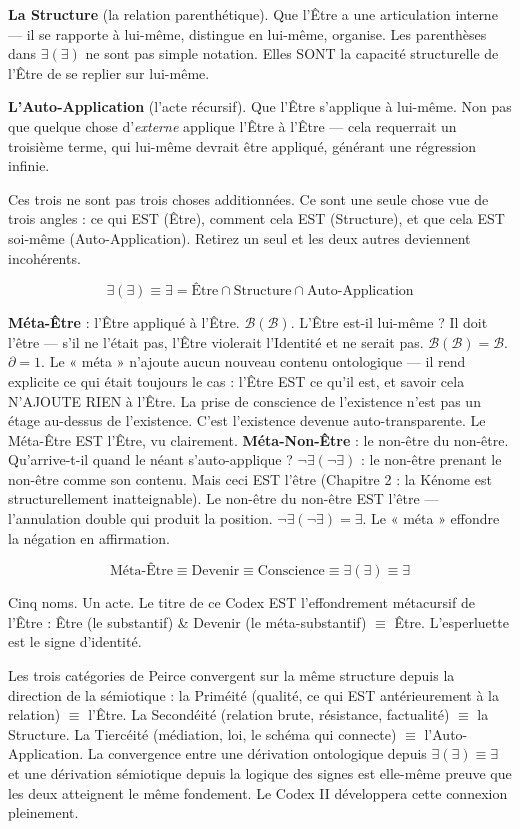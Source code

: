 \documentclass[10pt, openany, oneside]{book}
\begin{document}
\textbf{La Structure} (la relation parenthétique). Que l'Être a une articulation interne --- il se rapporte à lui-même, distingue en lui-même, organise. Les parenthèses dans $\exists(\exists)$ ne sont pas simple notation. Elles SONT la capacité structurelle de l'Être de se replier sur lui-même.

\textbf{L'Auto-Application} (l'acte récursif). Que l'Être s'applique à lui-même. Non pas que quelque chose d'\textit{externe} applique l'Être à l'Être --- cela requerrait un troisième terme, qui lui-même devrait être appliqué, générant une régression infinie.

Ces trois ne sont pas trois choses additionnées. Ce sont une seule chose vue de trois angles : ce qui EST (Être), comment cela EST (Structure), et que cela EST soi-même (Auto-Application). Retirez un seul et les deux autres deviennent incohérents.

$$\exists(\exists) \equiv \exists = \text{Être} \cap \text{Structure} \cap \text{Auto-Application}$$

\textbf{Méta-Être} : l'Être appliqué à l'Être. $\mathcal{B}(\mathcal{B})$. L'Être est-il lui-même ? Il doit l'être --- s'il ne l'était pas, l'Être violerait l'Identité et ne serait pas. $\mathcal{B}(\mathcal{B}) = \mathcal{B}$. $\partial = 1$. Le « méta » n'ajoute aucun nouveau contenu ontologique --- il rend explicite ce qui était toujours le cas : l'Être EST ce qu'il est, et savoir cela N'AJOUTE RIEN à l'Être. La prise de conscience de l'existence n'est pas un étage au-dessus de l'existence. C'est l'existence devenue auto-transparente. Le Méta-Être EST l'Être, vu clairement. \textbf{Méta-Non-Être} : le non-être du non-être. Qu'arrive-t-il quand le néant s'auto-applique ? $\neg\exists(\neg\exists)$ : le non-être prenant le non-être comme son contenu. Mais ceci EST l'être (Chapitre 2 : la Kénome est structurellement inatteignable). Le non-être du non-être EST l'être --- l'annulation double qui produit la position. $\neg\exists(\neg\exists) = \exists$. Le « méta » effondre la négation en affirmation.

$$\text{Méta-Être} \equiv \text{Devenir} \equiv \text{Conscience} \equiv \exists(\exists) \equiv \exists$$

Cinq noms. Un acte. Le titre de ce Codex EST l'effondrement métacursif de l'Être : Être (le substantif) \& Devenir (le méta-substantif) $\equiv$ Être. L'esperluette est le signe d'identité.

Les trois catégories de Peirce convergent sur la même structure depuis la direction de la sémiotique : la Priméité (qualité, ce qui EST antérieurement à la relation) $\equiv$ l'Être. La Secondéité (relation brute, résistance, factualité) $\equiv$ la Structure. La Tiercéité (médiation, loi, le schéma qui connecte) $\equiv$ l'Auto-Application. La convergence entre une dérivation ontologique depuis $\exists(\exists) \equiv \exists$ et une dérivation sémiotique depuis la logique des signes est elle-même preuve que les deux atteignent le même fondement. Le Codex II développera cette connexion pleinement.
\end{document}
